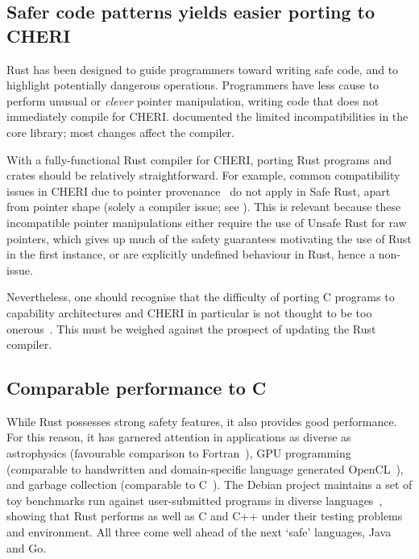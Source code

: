 \documentclass[dissertation.tex]{subfiles}
\begin{document}
\subsection{Safer code patterns yields easier porting to CHERI}
\label{sec:eval-cheri-port}

Rust has been designed to guide programmers toward writing safe code,
and to highlight potentially dangerous operations.
Programmers have less cause to perform unusual or \emph{clever} pointer
manipulation, writing code that does not immediately compile for CHERI.
 documented the limited incompatibilities in the core
library; most changes affect the compiler.

With a fully-functional Rust compiler for CHERI, porting Rust programs
and crates should be relatively straightforward.
For example, common compatibility issues in CHERI due to pointer
provenance~\cite{cheri-2019-abstract} do not apply in Safe Rust,
apart from pointer shape (solely a compiler issue; see
).
This is relevant because these incompatible pointer manipulations either
require the use of Unsafe Rust for raw pointers, which gives up much of
the safety guarantees motivating the use of Rust in the first instance,
or are explicitly undefined behaviour in Rust, hence a non-issue.

Nevertheless, one should recognise that the difficulty of porting C
programs to capability architectures and CHERI in particular is not
thought to be too onerous~\cite{capsicum-usability}.
This must be weighed against the prospect of updating the Rust compiler.


\subsection{Comparable performance to C}
\label{eval:cheri-perf}

While Rust possesses strong safety features, it also provides good
performance.
For this reason, it has garnered attention in applications as diverse as
astrophysics (favourable comparison to Fortran~\cite{blanco-astro}), GPU
programming (comparable to handwritten and domain-specific language
generated OpenCL~\cite{holk-gpu}), and garbage collection (comparable to
C~\cite{lin-gc}).
The Debian project maintains a set of toy benchmarks run against
user-submitted programs in diverse
languages~\cite{debian-benchmarksgame}, showing that Rust performs as
well as C and C++ under their testing problems and environment.
All three come well ahead of the next `safe' languages, Java and Go.
\end{document}
